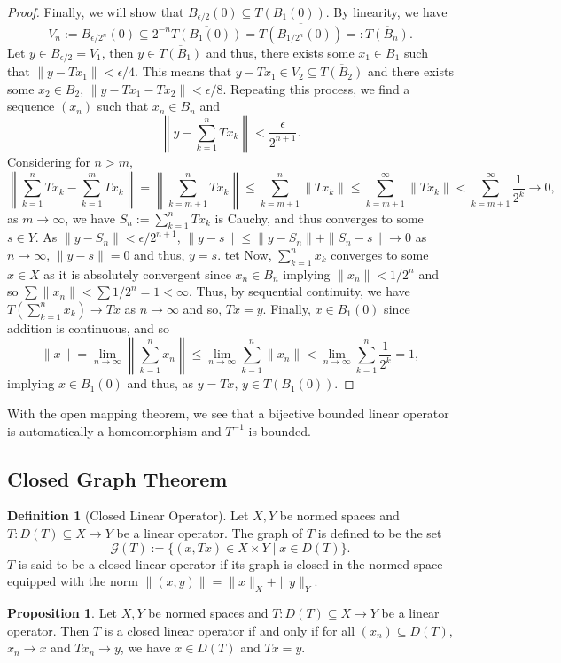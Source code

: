 \documentclass[]{article}
\theoremstyle{definition}
\theoremstyle{definition}
\newtheorem{definition}{Definition}[section]
\newtheorem{proposition}{Proposition}[section]
\begin{document}
\begin{proof}
  Finally, we will show that \(B_{\epsilon / 2}(0) \subseteq T(B_1(0))\). 
  By linearity, we have 
  \[V_n := B_{\epsilon / 2^n}(0) \subseteq 2^{-n} \overline{T(B_1(0))} = 
  \overline{T(B_{1 / 2^n}(0))} =: \overline{T(B_n)}.\]
  Let \(y \in B_{\epsilon / 2} = V_1\), then \(y \in \overline{T(B_1)}\) 
  and thus, there exists some \(x_1 \in B_1\) such that \(\|y - Tx_1\| < \epsilon / 4\).
  This means that \(y - Tx_1 \in V_2 \subseteq \overline{T(B_2)}\) and there 
  exists some \(x_2 \in B_2\), \(\|y - Tx_1 - Tx_2\| < \epsilon / 8\). 
  Repeating this process, we find a sequence \((x_n)\) such that \(x_n \in B_n\) 
  and 
  \[\left\| y - \sum_{k = 1}^n Tx_k \right\| < \frac{\epsilon}{2^{n + 1}}.\]
  Considering for \(n > m\), 
  \[\left\|\sum_{k = 1}^n Tx_k - \sum_{k = 1}^m Tx_k\right\| = 
    \left\|\sum_{k = m + 1}^n Tx_k\right\| \le 
    \sum_{k = m + 1}^n \| Tx_k\| \le \sum_{k = m + 1}^\infty \|T x_k\| < 
    \sum_{k = m + 1}^\infty \frac{1}{2^k} \to 0,\]
  as \(m \to \infty\), we have \(S_n := \sum_{k = 1}^n T x_k\) is Cauchy, and 
  thus converges to some \(s \in Y\). As \(\|y - S_n\| < \epsilon / 2^{n + 1}\), 
  \(\|y - s\| \le \|y - S_n\| + \|S_n - s\| \to 0\) as \(n \to \infty\), 
  \(\|y - s\| = 0\) and thus, \(y = s\).
  tet
  Now, \(\sum_{k = 1}^n x_k\) converges to some \(x \in X\) as it is 
  absolutely convergent since \(x_n \in B_n\) implying \(\|x_n\| < 1 / 2^n\) 
  and so \(\sum \|x_n\| < \sum 1 / 2^n = 1 < \infty\). Thus, by sequential 
  continuity, we have 
  \(T(\sum_{k = 1}^n x_k) \to T x\) as \(n \to \infty\) and so, \(Tx = y\).
  Finally, \(x \in B_1(0)\) since addition is continuous, and so 
  \[\|x\| = \lim_{n \to \infty} \left\| \sum_{k = 1}^n x_n \right\|
    \le \lim_{n \to \infty} \sum_{k = 1}^n \|x_n\| < 
    \lim_{n \to \infty} \sum_{k = 1}^n \frac{1}{2^k} = 1,\]
  implying \(x \in B_1(0)\) and thus, as \(y = Tx\), \(y \in T(B_1(0))\).
\end{proof}

With the open mapping theorem, we see that a bijective bounded linear operator 
is automatically a homeomorphism and \(T^{-1}\) is bounded.

\subsection{Closed Graph Theorem}

\begin{definition}[Closed Linear Operator]
  Let \(X, Y\) be normed spaces and \(T : D(T) \subseteq X \to Y\) be a linear 
  operator. The graph of \(T\) is defined to be the set 
  \[\mathcal{G}(T) := \{(x, Tx) \in X \times Y \mid x \in D(T)\}.\]
  \(T\) is said to be a closed linear operator if its graph is closed 
  in the normed space equipped with the norm \(\|(x, y)\| = \|x\|_X + \|y\|_Y\).
\end{definition}

\begin{proposition}
  Let \(X, Y\) be normed spaces and \(T : D(T) \subseteq X \to Y\) be a 
  linear operator. Then \(T\) is a closed linear operator if and only if 
  for all \((x_n) \subseteq D(T)\), \(x_n \to x\) and \(T x_n \to y\), 
  we have \(x \in D(T)\) and \(Tx = y\).
\end{proposition}
\end{document}
